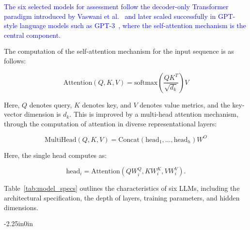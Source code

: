 \documentclass[10pt,letterpaper]{article}
\newcommand{\rev}[1]{\textcolor{blue}{#1}}
\begin{document}
\rev{The six selected models for assessment follow the decoder-only Transformer paradigm introduced by Vaswani et al.~\cite{b54} and later scaled successfully in GPT-style language models such as GPT-3~\cite{b55}, where the self-attention mechanism is the central component.}

The computation of the self-attention mechanism for the input sequence is as follows:

\begin{equation}
\text{Attention}(Q, K, V) = \text{softmax}\left(\frac{QK^{T}}{\sqrt{d_k}}\right)V
\label{eq:attention}
\end{equation}

Here, \(Q\) denotes query, \(K\) denotes key, and \(V\) denotes value metrics, and the key-vector dimension is \(d_k\). This is improved by a multi-head attention mechanism, through the computation of attention in diverse representational layers:

\begin{equation}
\text{MultiHead}(Q, K, V) = \text{Concat}(\text{head}_1, \ldots, \text{head}_h)W^{O}
\label{eq:multihead}
\end{equation}

Here, the single head computes as: 

\begin{equation}
\text{head}_i = \text{Attention}(QW^{Q}_i, KW^{K}_i, VW^{V}_i).
\label{eq:head}
\end{equation}

Table~\ref{tab:model_specs} outlines the characteristics of six LLMs, including the architectural specification, the depth of layers, training parameters, and hidden dimensions.  

\begin{table}[!t]
\begin{adjustwidth}{-2.25in}{0in}
\centering
\caption{Detailed Architectural Specifications of Evaluated Large Language Models.}
\label{tab:model_specs}
\renewcommand{\arraystretch}{1.2}
\setlength{\tabcolsep}{5pt}
\end{adjustwidth}
\vspace{-0.3cm}
\end{table}
\end{document}
